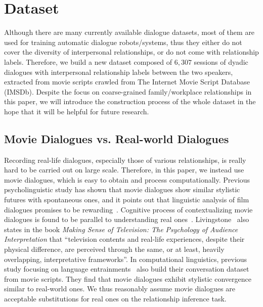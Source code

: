 \section{Dataset}
\label{sec:data}
Although there are many currently available dialogue datasets, 
most of them are used for training automatic dialogue robots/systems, 
thus they either do not cover the diversity of interpersonal relationships, 
or do not come with relationship labels.
Therefore, we build a new dataset 
composed of $6,307$ sessions of dyadic dialogues with 
interpersonal relationship labels between the two speakers, 
extracted from movie scripts crawled from 
The Internet Movie Script Database (IMSDb).
Despite the focus on coarse-grained family/workplace relationships 
in this paper, we will introduce the construction process of the whole dataset
in the hope that it will be helpful for future research.

\subsection{Movie Dialogues vs. Real-world Dialogues}
Recording real-life dialogues, especially those of various relationships, 
is really hard to be carried out on large scale. Therefore, in this paper,
we instead use movie dialogues, which is 
easy to obtain and process computationally. 
Previous psycholinguistic study has shown that movie dialogues
show similar stylistic futures with spontaneous ones, and it points
out that linguistic analysis of film dialogues promises to be 
rewarding~\cite{overhearer}. Cognitive process of contextualizing
movie dialogues is found to be parallel to understanding real ones~\cite{FSC}.
Livingstone~\cite{television} also states in 
the book \textit{Making Sense of Television: The Psychology of 
Audience Interpretation} that ``television contents and real-life experiences, 
despite their physical difference, are perceived through the same, 
or at least, heavily overlapping, interpretative frameworks''. In computational
linguistics, previous study focusing on language entrainments~\cite{cornell-corpus} 
also build their conversation dataset from movie scripts. 
They find that movie dialogues exhibit stylistic convergence 
similar to real-world ones.
We thus reasonably assume movie dialogues are acceptable
substitutions for real ones on the relationship inference task.

